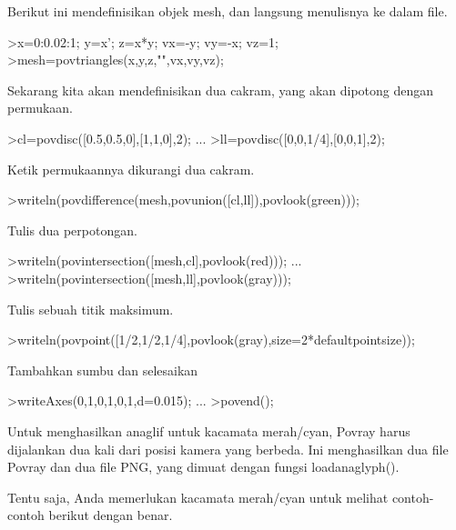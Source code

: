 \documentclass{article}
\begin{document}
\begin{eulernotebook}
\begin{eulercomment}
Berikut ini mendefinisikan objek mesh, dan langsung menulisnya ke
dalam file.
\end{eulercomment}
\begin{eulerprompt}
>x=0:0.02:1; y=x'; z=x*y; vx=-y; vy=-x; vz=1;
>mesh=povtriangles(x,y,z,"",vx,vy,vz);
\end{eulerprompt}
\begin{eulercomment}
Sekarang kita akan mendefinisikan dua cakram, yang akan dipotong
dengan permukaan.
\end{eulercomment}
\begin{eulerprompt}
>cl=povdisc([0.5,0.5,0],[1,1,0],2); ...
>ll=povdisc([0,0,1/4],[0,0,1],2);
\end{eulerprompt}
\begin{eulercomment}
Ketik permukaannya dikurangi dua cakram.
\end{eulercomment}
\begin{eulerprompt}
>writeln(povdifference(mesh,povunion([cl,ll]),povlook(green)));
\end{eulerprompt}
\begin{eulercomment}
Tulis dua perpotongan.
\end{eulercomment}
\begin{eulerprompt}
>writeln(povintersection([mesh,cl],povlook(red))); ...
>writeln(povintersection([mesh,ll],povlook(gray)));
\end{eulerprompt}
\begin{eulercomment}
Tulis sebuah titik maksimum.
\end{eulercomment}
\begin{eulerprompt}
>writeln(povpoint([1/2,1/2,1/4],povlook(gray),size=2*defaultpointsize));
\end{eulerprompt}
\begin{eulercomment}
Tambahkan sumbu dan selesaikan
\end{eulercomment}
\begin{eulerprompt}
>writeAxes(0,1,0,1,0,1,d=0.015); ...
>povend();
\end{eulerprompt}
\begin{eulercomment}
Untuk menghasilkan anaglif untuk kacamata merah/cyan, Povray harus
dijalankan dua kali dari posisi kamera yang berbeda. Ini menghasilkan
dua file Povray dan dua file PNG, yang dimuat dengan fungsi
loadanaglyph().

Tentu saja, Anda memerlukan kacamata merah/cyan untuk melihat
contoh-contoh berikut dengan benar.


\end{eulercomment}
\end{eulernotebook}
\end{document}
